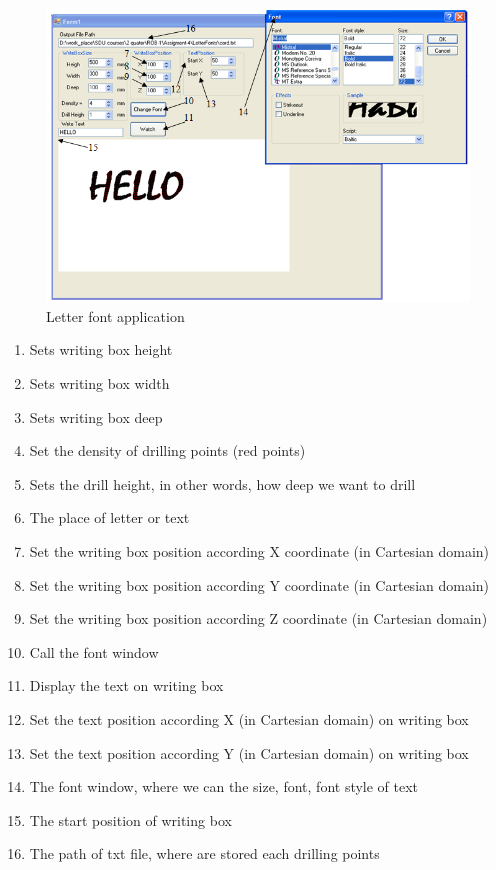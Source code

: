 \begin{figure}[H]
  \centering
  \includegraphics[scale= 0.8]{source/letterapp.png}
  \caption{Letter font application}
  \label{fig:letterapp}
\end{figure}

\begin{enumerate}
\item Sets writing box height
\item Sets writing box width
\item Sets writing box deep
\item Set the density of drilling points (red points)
\item Sets the drill height, in other words, how deep we want to drill
\item The place of letter or text
\item Set the writing box position according X coordinate (in Cartesian domain)
\item Set the writing box position according Y coordinate (in Cartesian domain)
\item Set the writing box position according Z coordinate (in Cartesian domain) 
\item Call the font window
\item Display the text on writing box
\item Set the text position according X (in Cartesian domain) on writing box
\item Set the text position according Y (in Cartesian domain) on writing box
\item The font window, where we can the size, font, font style of text
\item The start position of writing box
\item The path of txt file, where are stored each drilling points
\end{enumerate}

